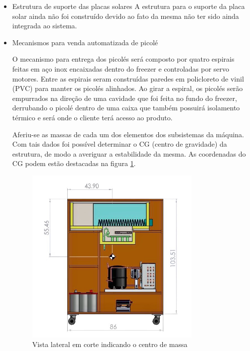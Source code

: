  \begin{itemize}
\item Estrutura de suporte das placas solares
A estrutura para o suporte da placa solar ainda não foi construído devido ao fato da mesma não ter sido ainda integrada ao sistema.
\item Mecanismos para venda automatizada de picolé

O mecanismo para entrega dos picolés será composto por quatro espirais feitas em aço inox encaixadas dentro do freezer e controladas por servo motores. Entre as espirais seram construídas paredes em policloreto de vinil (PVC) para manter os picolés alinhados. Ao girar a espiral, os picolés serão empurrados na direção de uma cavidade que foi feita no fundo do freezer, derrubando o picolé dentro de uma caixa que também possuirá isolamento térmico e será onde o cliente terá acesso ao produto.

Aferiu-se as massas de cada um dos elementos dos subsistemas da máquina. Com tais dados foi possível determinar o CG (centro de gravidade) da estrutura, de modo a averiguar a estabilidade da mesma. As coordenadas do CG podem estão destacadas na figura \ref{fig:cad_vista_lateral}.

   \begin{figure}[H]
	\centering
    \includegraphics[width=0.8\textwidth]{figuras/cad_vista_lateral}
    \caption{Vista lateral em corte indicando o centro de massa}
    \label{fig:cad_vista_lateral}
\end{figure}


\end{itemize}
